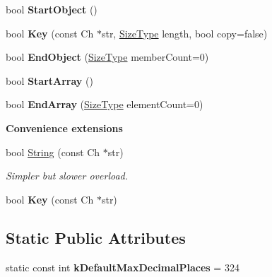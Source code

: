 \begin{Indent}
\begin{DoxyCompactItemize}
\mbox{\label{class_writer_aec3200b2fc80ec87d1c37f775256b2e1}} 
bool {\bfseries Start\+Object} ()
\item 
\mbox{\label{class_writer_a19096d2ccb90761f63ab1240337bf90a}} 
bool {\bfseries Key} (const Ch $\ast$str, \hyperlink{rapidjson_8h_a5ed6e6e67250fadbd041127e6386dcb5}{Size\+Type} length, bool copy=false)
\item 
\mbox{\label{class_writer_a0771a565261564c27676b7300b11f2b5}} 
bool {\bfseries End\+Object} (\hyperlink{rapidjson_8h_a5ed6e6e67250fadbd041127e6386dcb5}{Size\+Type} member\+Count=0)
\item 
\mbox{\label{class_writer_a38715785194b42cd67ba5dd52bf7967e}} 
bool {\bfseries Start\+Array} ()
\item 
\mbox{\label{class_writer_ac88d533095591a878500b63b351d4013}} 
bool {\bfseries End\+Array} (\hyperlink{rapidjson_8h_a5ed6e6e67250fadbd041127e6386dcb5}{Size\+Type} element\+Count=0)
\end{DoxyCompactItemize}
\end{Indent}
\begin{Indent}\textbf{ Convenience extensions}\par
\begin{DoxyCompactItemize}
\item 
\mbox{\label{class_writer_a24eb1a72b42da5fe51ff99d9c293dd11}} 
bool \hyperlink{class_writer_a24eb1a72b42da5fe51ff99d9c293dd11}{String} (const Ch $\ast$str)
\begin{DoxyCompactList}\small\item\em Simpler but slower overload. \end{DoxyCompactList}\item 
\mbox{\label{class_writer_a8a40514efe951801df6896a596ed8563}} 
bool {\bfseries Key} (const Ch $\ast$str)
\end{DoxyCompactItemize}
\end{Indent}
\subsection*{Static Public Attributes}
\begin{DoxyCompactItemize}
\item 
\mbox{\label{class_writer_ab46d66ae0ca78cb03ab7fb865d129934}} 
static const int {\bfseries k\+Default\+Max\+Decimal\+Places} = 324
\end{DoxyCompactItemize}
